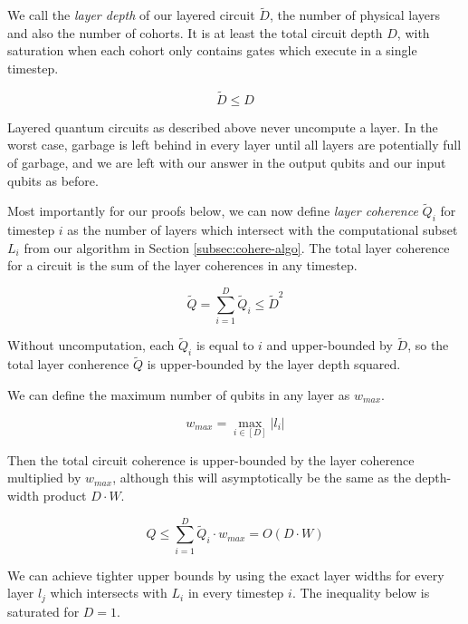 We call the \emph{layer depth} of our layered circuit $\tilde{D}$, the number
of physical layers and also the number of cohorts.
It is at least the total circuit depth $D$, with saturation when each cohort
only contains gates which execute in a single timestep.

\begin{equation}
\tilde{D} \le D
\end{equation}

Layered quantum circuits as described above never uncompute
a layer. In the worst case, garbage is left behind in every
layer until all layers are potentially full of garbage,
and we are left with our answer in the output qubits and
our input qubits as before.

Most importantly for our proofs below, we can now define
\emph{layer coherence} $\tilde{Q}_i$  for timestep $i$
as the number of layers which intersect with the computational
subset $L_i$ from our algorithm in Section \ref{subsec:cohere-algo}.
The total layer coherence for a circuit is the sum of the
layer coherences in any timestep.

\begin{equation}
\tilde{Q} = \sum_{i=1}^{D} \tilde{Q}_i \le \tilde{D}^2
\end{equation}

Without uncomputation, each $\tilde{Q}_i$ is equal to $i$ and upper-bounded by $\tilde{D}$,
so the total layer conherence $\tilde{Q}$ is upper-bounded by the layer depth squared.

We can define the maximum number of qubits in any layer as $w_{max}$.

\begin{equation}
w_{max} = \max_{i \in [D]} |l_i|
\end{equation}

Then the total circuit coherence is upper-bounded by the layer coherence
multiplied by $w_{max}$, although this will asymptotically be the same as the depth-width product $D\cdot W$.

\begin{equation}
Q \le \sum_{i=1}^{D} \tilde{Q}_i \cdot w_{max} = O(D\cdot W)
\end{equation}

We can achieve tighter upper bounds by using the exact layer widths for every
layer $l_j$ which intersects with $L_i$ in every timestep $i$.
The inequality below is saturated for $D=1$.


